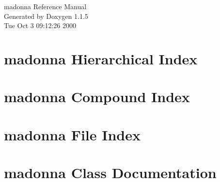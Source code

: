 \documentclass[a4paper]{article}
\begin{document}
\begin{titlepage}
\vspace*{7cm}
\begin{center}
{\Large madonna Reference Manual}\\
\vspace*{1cm}
{\large Generated by Doxygen 1.1.5}\\
\vspace*{0.5cm}
{\small Tue Oct 3 09:12:26 2000}\\
\end{center}
\end{titlepage}
\tableofcontents
{}
\section{madonna Hierarchical Index}

\section{madonna Compound Index}

\section{madonna File Index}

\section{madonna Class Documentation}
































































\end{document}
